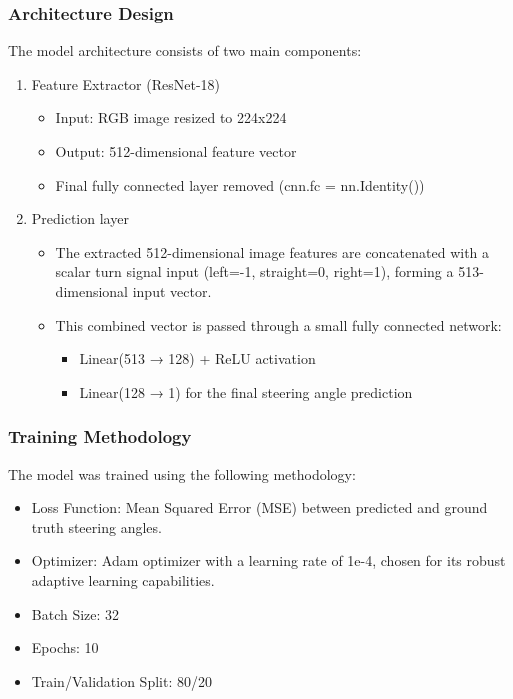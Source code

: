 \documentclass{article} %
\begin{document}
\subsubsection{Architecture Design}
The model architecture consists of two main components:
\begin{enumerate}
  \item Feature Extractor (ResNet-18)
    \begin{itemize}
      \item Input: RGB image resized to 224x224
      \item Output: 512-dimensional feature vector
      \item Final fully connected layer removed (cnn.fc = nn.Identity())
    \end{itemize}
  \item Prediction layer
    \begin{itemize}
      \item The extracted 512-dimensional image features are concatenated with a scalar turn signal input (left=-1, straight=0, right=1), forming a 513-dimensional input vector.
      \item This combined vector is passed through a small fully connected network:
      \begin{itemize}
        \item Linear(513 → 128) + ReLU activation
        \item Linear(128 → 1) for the final steering angle prediction
      \end{itemize}
    \end{itemize}
\end{enumerate}
\subsubsection{Training Methodology}
The model was trained using the following methodology:
\begin{itemize}
  \item Loss Function: Mean Squared Error (MSE) between predicted and ground truth steering angles.
  \item Optimizer: Adam optimizer with a learning rate of 1e-4, chosen for its robust adaptive learning capabilities.
  \item Batch Size: 32
  \item Epochs: 10
  \item Train/Validation Split: 80/20
\end{itemize}
\end{document}
